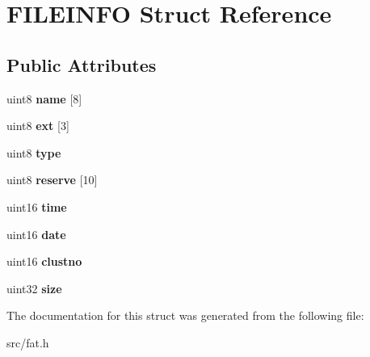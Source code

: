 \hypertarget{struct_f_i_l_e_i_n_f_o}{}\section{F\+I\+L\+E\+I\+N\+F\+O Struct Reference}
\label{struct_f_i_l_e_i_n_f_o}
\subsection*{Public Attributes}
\begin{DoxyCompactItemize}
\item 
\hypertarget{struct_f_i_l_e_i_n_f_o_aae642c63017e6dd67bc8c151304fd5ea}{}uint8 {\bfseries name} \mbox{[}8\mbox{]}\label{struct_f_i_l_e_i_n_f_o_aae642c63017e6dd67bc8c151304fd5ea}

\item 
\hypertarget{struct_f_i_l_e_i_n_f_o_a2ad95d9a9ea89c8a9e2f05e8ff51f7eb}{}uint8 {\bfseries ext} \mbox{[}3\mbox{]}\label{struct_f_i_l_e_i_n_f_o_a2ad95d9a9ea89c8a9e2f05e8ff51f7eb}

\item 
\hypertarget{struct_f_i_l_e_i_n_f_o_a18ba5a4ac8b2c7fd4c7b4f356d6429ba}{}uint8 {\bfseries type}\label{struct_f_i_l_e_i_n_f_o_a18ba5a4ac8b2c7fd4c7b4f356d6429ba}

\item 
\hypertarget{struct_f_i_l_e_i_n_f_o_a020320cd733f3ea99a30cbb5cf3185d6}{}uint8 {\bfseries reserve} \mbox{[}10\mbox{]}\label{struct_f_i_l_e_i_n_f_o_a020320cd733f3ea99a30cbb5cf3185d6}

\item 
\hypertarget{struct_f_i_l_e_i_n_f_o_a8bd3383d6c9c4d9828380915e615f8cc}{}uint16 {\bfseries time}\label{struct_f_i_l_e_i_n_f_o_a8bd3383d6c9c4d9828380915e615f8cc}

\item 
\hypertarget{struct_f_i_l_e_i_n_f_o_ab0017041c05502d8c7e6b44f01f9645d}{}uint16 {\bfseries date}\label{struct_f_i_l_e_i_n_f_o_ab0017041c05502d8c7e6b44f01f9645d}

\item 
\hypertarget{struct_f_i_l_e_i_n_f_o_ab37c19f1cf5456b4d76ba187dd8c0117}{}uint16 {\bfseries clustno}\label{struct_f_i_l_e_i_n_f_o_ab37c19f1cf5456b4d76ba187dd8c0117}

\item 
\hypertarget{struct_f_i_l_e_i_n_f_o_ae5573e9298ccbf72bd65189fe730fcde}{}uint32 {\bfseries size}\label{struct_f_i_l_e_i_n_f_o_ae5573e9298ccbf72bd65189fe730fcde}

\end{DoxyCompactItemize}


The documentation for this struct was generated from the following file\+:\begin{DoxyCompactItemize}
\item 
src/fat.\+h\end{DoxyCompactItemize}
